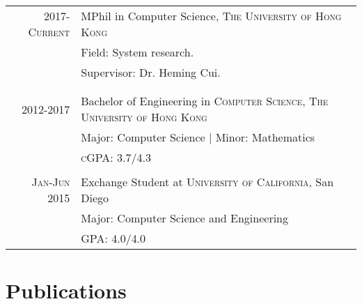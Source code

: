 \documentclass[a4paper,8pt]{article} %
\begin{document}
\begin{tabular}{rl}	



\textsc{2017-Current} & MPhil in Computer Science, \textsc{The University of Hong Kong}\\
& Field: System research.\\
& Supervisor: Dr. Heming Cui.\\
\\&\\

\textsc{2012-2017} & Bachelor of Engineering in \textsc{Computer Science}, \textsc{The University of Hong Kong}\\
& Major: Computer Science | Minor: Mathematics\\
&\normalsize \textsc{cGPA}: 3.7/4.3 
\\&\\

\textsc{Jan-Jun} 2015& Exchange Student at \textsc{}\textsc{University of California}, San Diego  \\
& Major: Computer Science and Engineering \\
&\normalsize \textsc{GPA}: 4.0/4.0 \\


\end{tabular}



\section{Publications}
\end{document}
